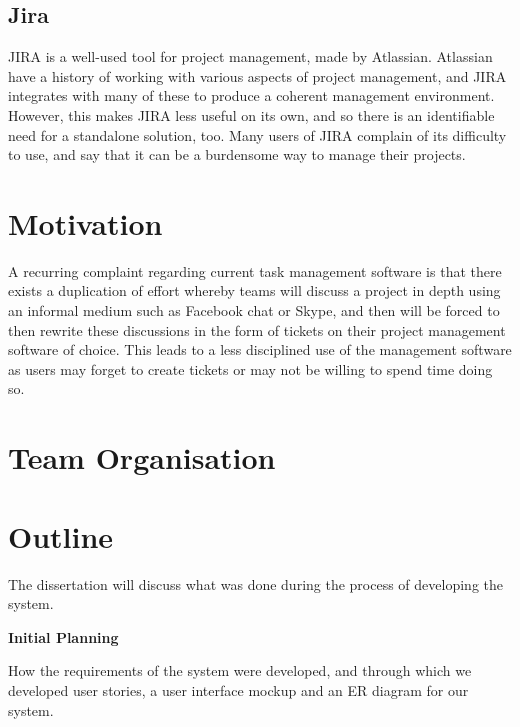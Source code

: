 \documentclass[a4paper]{l3proj}
\begin{document}
\subsection{Jira}
\label{jira}
JIRA is a well-used tool for project management, made by Atlassian. Atlassian have a history of working with various aspects of project management, and JIRA integrates with many of these to produce a coherent management environment. However, this makes JIRA less useful on its own, and so there is an identifiable need for a standalone solution, too. Many users of JIRA complain of its difficulty to use, and say that it can be a burdensome way to manage their projects.

\section{Motivation}

A recurring complaint regarding current task management software is that there exists a duplication of effort whereby teams will discuss a project in depth using an informal medium such as Facebook chat or Skype, and then will be forced to then rewrite these discussions in the form of tickets on their project management software of choice.  This leads to a less disciplined use of the management software as users may forget to create tickets or may not be willing to spend time doing so.

\section{Team Organisation}

\section{Outline}

The dissertation will discuss what was done during the process of developing the system.

\textbf{Initial Planning}

How the requirements of the system were developed, and through which we developed user stories, a user interface mockup and an ER diagram for our system.
\end{document}
